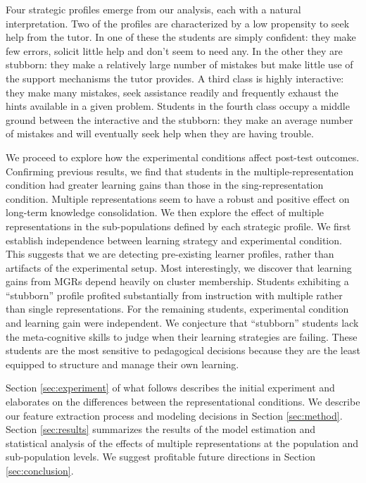 \documentclass{edm_template}
\begin{document}
Four strategic profiles emerge from our analysis, each with a natural interpretation. Two of the profiles are characterized by a low propensity to seek help from the tutor. In one of these the students are simply confident: they make few errors, solicit little help and don't seem to need any. In the other they are stubborn: they make a relatively large number of mistakes but make little use of the support mechanisms the tutor provides. A third class is highly interactive: they make many mistakes, seek assistance readily and frequently exhaust the hints available in a given problem. Students in the fourth class occupy a middle ground between the interactive and the stubborn: they make an average number of mistakes and will eventually seek help when they are having trouble.

We proceed to explore how the experimental conditions affect post-test outcomes. Confirming previous results, we find that students in the multiple-representation condition had greater learning gains than those in the sing-representation condition. Multiple representations seem to have a robust and positive effect on long-term knowledge consolidation. We then explore the effect of multiple representations in the sub-populations defined by each strategic profile. We first establish independence between learning strategy and experimental condition. This suggests that we are detecting pre-existing learner profiles, rather than artifacts of the experimental setup. Most interestingly, we discover that learning gains from MGRs depend heavily on cluster membership. Students exhibiting a ``stubborn'' profile profited substantially from instruction with multiple rather than single representations. For the remaining students, experimental condition and learning gain were independent. We conjecture that ``stubborn'' students lack the meta-cognitive skills to judge when their learning strategies are failing. These students are the most sensitive to pedagogical decisions because they are the least equipped to structure and manage their own learning. 

Section \ref{sec:experiment} of what follows describes the initial experiment and elaborates on the differences between the representational conditions. We describe our feature extraction process and modeling decisions in Section \ref{sec:method}. Section \ref{sec:results} summarizes the results of the model estimation and statistical analysis of the effects of multiple representations at the population and sub-population levels. We  suggest profitable future directions in Section \ref{sec:conclusion}.
\end{document}
